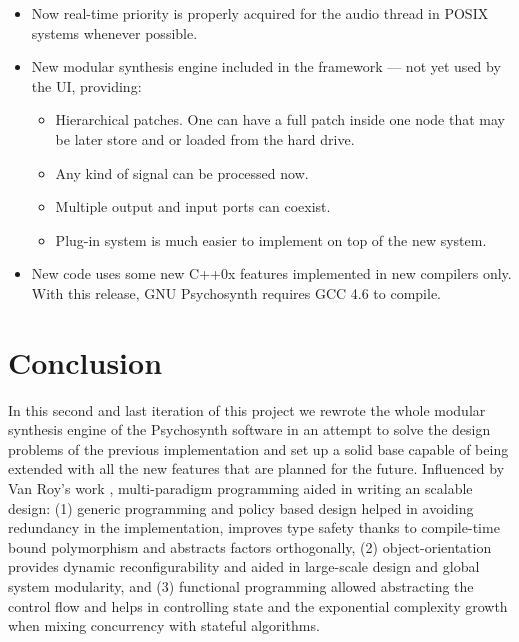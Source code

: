 \begin{mynote}
  \label{note:changelog021}
  \begin{itemize}
  \item Now real-time priority is properly acquired for the audio
    thread in POSIX systems whenever possible.
  \item New modular synthesis engine included in the framework --- not
    yet used by the UI, providing:
    \begin{itemize}
    \item Hierarchical patches. One can have a full patch inside one
      node that may be later store and or loaded from the hard drive.
    \item Any kind of signal can be processed now.
    \item Multiple output and input ports can coexist.
    \item Plug-in system is much easier to implement on top of the new
      system.
    \end{itemize}
  \item New code uses some new C++0x features implemented in new
    compilers only. With this release, GNU Psychosynth requires GCC
    4.6 to compile.
  \end{itemize}
\end{mynote}

\section{Conclusion}

In this second and last iteration of
this project we rewrote the whole modular synthesis engine of the
Psychosynth software in an attempt to solve the design problems of the
previous implementation and set up a solid base capable of being
extended with all the new features that are planned for the
future. Influenced by Van Roy's work \cite{roy04concepts},
multi-paradigm programming aided in writing an scalable design: (1)
generic programming and policy based design helped in avoiding
redundancy in the implementation, improves type safety thanks to
compile-time bound polymorphism and abstracts factors orthogonally,
(2) object-orientation provides dynamic reconfigurability and aided in
large-scale design and global system modularity, and (3) functional
programming allowed abstracting the control flow and helps in
controlling state and the exponential complexity growth when mixing
concurrency with stateful algorithms.

